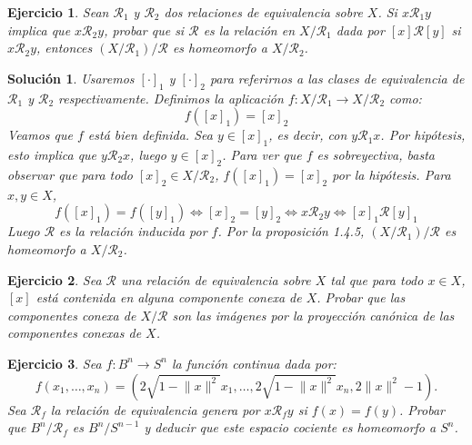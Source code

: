 \documentclass{article}
\theoremstyle{plain}
\newtheorem{exercise}{Ejercicio}
\newtheorem*{sol*}{Solución}
\providecommand{\norm}[1]{\lVert#1\rVert}
\begin{document}
\newpage
\begin{exercise}
Sean $\mathcal{R}_1$ y $\mathcal{R}_2$ dos relaciones de equivalencia sobre $X$. Si $x \mathcal{R}_1 y$ implica que $x \mathcal{R}_2 y$, probar que si $\mathcal{R}$ es la relación en $X/\mathcal{R}_1$ dada por $[x] \mathcal{R} [y]$ si $x \mathcal{R}_2 y$, entonces $(X/\mathcal{R}_1)/\mathcal{R}$ es homeomorfo a $X / \mathcal{R}_2$.
\end{exercise}
\begin{sol*}
Usaremos $[\cdot]_1$ y $[\cdot]_2$ para referirnos a las clases de equivalencia de $\mathcal{R}_1$ y $\mathcal{R}_2$ respectivamente. Definimos la aplicación $f : X/\mathcal{R}_1 \to X/\mathcal{R}_2$ como:
\[ f ([x]_1) = [x]_2 \]
Veamos que $f$ está bien definida. Sea $y \in [x]_1$, es decir, con $y \mathcal{R}_1 x$. Por hipótesis, esto implica que $y \mathcal{R}_2 x$, luego $y \in [x]_2$. Para ver que $f$ es sobreyectiva, basta observar que para todo $[x]_2 \in X/\mathcal{R}_2$, $f([x]_1) = [x]_2$ por la hipótesis. Para $x,y \in X$, 
	\[ f([x]_1) = f([y]_1) \Leftrightarrow [x]_2 = [y]_2 \Leftrightarrow x \mathcal{R}_2 y \Leftrightarrow [x]_1 \mathcal{R} [y]_1 \]
	Luego $\mathcal{R}$ es la relación inducida por $f$. Por la proposición 1.4.5,  $(X/\mathcal{R}_1)/\mathcal{R}$ es homeomorfo a $X/\mathcal{R}_2$.
\end{sol*}

\newpage
\begin{exercise}
Sea $\mathcal{R}$ una relación de equivalencia sobre $X$ tal que para todo $x \in X$, $[x]$ está contenida en alguna componente conexa de $X$. Probar que las componentes conexa de $X/\mathcal{R}$ son las imágenes por la proyección canónica de las componentes conexas de $X$.
\end{exercise}


\newpage
\begin{exercise} Sea $f : B^n \to S^n$ la función continua dada por:
\[ f(x_1,\dots,x_n) = (2 \sqrt{1-\norm{x}^2}x_1, \dots, 2 \sqrt{1-\norm{x}^2}x_n, 2 \norm{x}^2-1). \]
Sea $\mathcal{R}_f$ la relación de equivalencia genera por $x \mathcal{R}_f y$ si $f(x) = f(y)$. Probar que $B ^n/\mathcal{R}_f$ es $B^n/S^{n-1}$ y deducir que este espacio cociente es homeomorfo a $S^n$.
\end{exercise}
\end{document}
